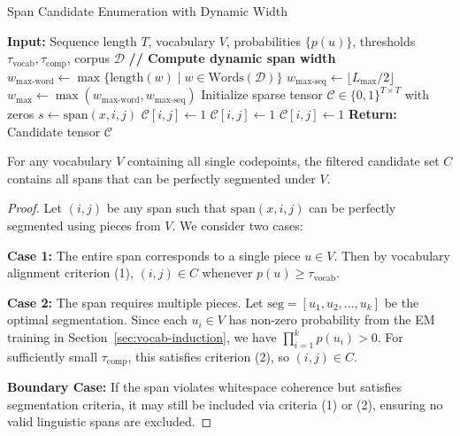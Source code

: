 \begin{algorithm}[H]
	\caption{Span Candidate Enumeration with Dynamic Width}
	\label{alg:span-candidates}
	\begin{algorithmic}[1]
		\STATE \textbf{Input:} Sequence length \(T\), vocabulary \(V\), probabilities \(\{p(u)\}\), 
		\STATE \qquad thresholds \(\tau_{\text{vocab}}, \tau_{\text{comp}}\), corpus \(\mathcal{D}\)
		\STATE \textbf{// Compute dynamic span width}
		\STATE \(w_{\text{max-word}} \leftarrow \max\{\text{length}(w) \mid w \in \text{Words}(\mathcal{D})\}\)
		\STATE \(w_{\text{max-seq}} \leftarrow \lfloor L_{\max} / 2 \rfloor\)
		\STATE \(w_{\max} \leftarrow \max(w_{\text{max-word}}, w_{\text{max-seq}})\)
		\STATE 
		\STATE Initialize sparse tensor \(\mathcal{C} \in \{0,1\}^{T \times T}\) with zeros
		\STATE \(s \leftarrow \text{span}(x, i, j)\) 
		\STATE \(\mathcal{C}[i,j] \leftarrow 1\)
		\STATE \(\mathcal{C}[i,j] \leftarrow 1\)
		\STATE \(\mathcal{C}[i,j] \leftarrow 1\)
		\ENDIF
		\ENDFOR
		\ENDFOR
		\STATE \textbf{Return:} Candidate tensor \(\mathcal{C}\)
	\end{algorithmic}
\end{algorithm}

\begin{proposition}
	For any vocabulary \(V\) containing all single codepoints, the filtered candidate set \(C\) contains all spans that can be perfectly segmented under \(V\).
\end{proposition}

\begin{proof}
	Let \((i,j)\) be any span such that \(\text{span}(x, i, j)\) can be perfectly segmented using pieces from \(V\). We consider two cases:
	
	\textbf{Case 1:} The entire span corresponds to a single piece \(u \in V\). Then by vocabulary alignment criterion (1), \((i,j) \in C\) whenever \(p(u) \geq \tau_{\text{vocab}}\).
	
	\textbf{Case 2:} The span requires multiple pieces. Let \(\text{seg} = [u_1, u_2, \ldots, u_k]\) be the optimal segmentation. Since each \(u_i \in V\) has non-zero probability from the EM training in Section~\ref{sec:vocab-induction}, we have \(\prod_{i=1}^k p(u_i) > 0\). For sufficiently small \(\tau_{\text{comp}}\), this satisfies criterion (2), so \((i,j) \in C\).
	
	\textbf{Boundary Case:} If the span violates whitespace coherence but satisfies segmentation criteria, it may still be included via criteria (1) or (2), ensuring no valid linguistic spans are excluded.
\end{proof}

